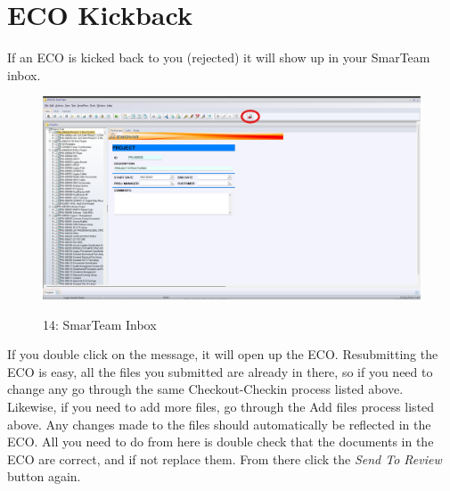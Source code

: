 \documentclass[10pt]{article}
\begin{document}
    \section{ECO Kickback}
        If an ECO is kicked back to you (rejected) it will show up in your SmarTeam inbox.
        \begin{figure}[H]
            \centerline{\includegraphics[width=\textwidth]{References/ST Inbox.png}}
            \figurename{ 14: SmarTeam Inbox}
        \end{figure}
        If you double click on the message, it will open up the ECO. Resubmitting the ECO is easy, all the files you submitted are already in there, so if you need to change any go through the same Checkout-Checkin process listed above. Likewise, if you need to add more files, go through the Add files process listed above. Any changes made to the files should automatically be reflected in the ECO. All you need to do from here is double check that the documents in the ECO are correct, and if not replace them. From there click the \emph{Send To Review} button again.
\end{document}
